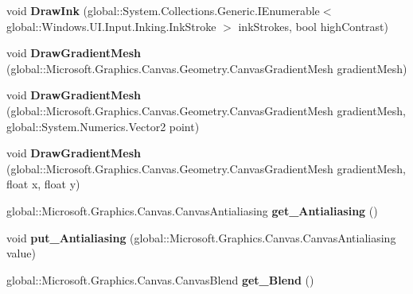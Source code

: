 \begin{DoxyCompactItemize}
void {\bfseries Draw\+Ink} (global\+::\+System.\+Collections.\+Generic.\+I\+Enumerable$<$ global\+::\+Windows.\+U\+I.\+Input.\+Inking.\+Ink\+Stroke $>$ ink\+Strokes, bool high\+Contrast)
\item 
\mbox{\label{class_microsoft_1_1_graphics_1_1_canvas_1_1_canvas_drawing_session_acf46c3a66def149f54e2c2cbc75af600}} 
void {\bfseries Draw\+Gradient\+Mesh} (global\+::\+Microsoft.\+Graphics.\+Canvas.\+Geometry.\+Canvas\+Gradient\+Mesh gradient\+Mesh)
\item 
\mbox{\label{class_microsoft_1_1_graphics_1_1_canvas_1_1_canvas_drawing_session_a6725dffba5937e6088ddbc6132d69550}} 
void {\bfseries Draw\+Gradient\+Mesh} (global\+::\+Microsoft.\+Graphics.\+Canvas.\+Geometry.\+Canvas\+Gradient\+Mesh gradient\+Mesh, global\+::\+System.\+Numerics.\+Vector2 point)
\item 
\mbox{\label{class_microsoft_1_1_graphics_1_1_canvas_1_1_canvas_drawing_session_a304f85a9e137c9f1190e83693361bae7}} 
void {\bfseries Draw\+Gradient\+Mesh} (global\+::\+Microsoft.\+Graphics.\+Canvas.\+Geometry.\+Canvas\+Gradient\+Mesh gradient\+Mesh, float x, float y)
\item 
\mbox{\label{class_microsoft_1_1_graphics_1_1_canvas_1_1_canvas_drawing_session_ace70b6710e7b5968f6cb715842e62a5a}} 
global\+::\+Microsoft.\+Graphics.\+Canvas.\+Canvas\+Antialiasing {\bfseries get\+\_\+\+Antialiasing} ()
\item 
\mbox{\label{class_microsoft_1_1_graphics_1_1_canvas_1_1_canvas_drawing_session_a643deac9ab9103ed88e1228b0604aa37}} 
void {\bfseries put\+\_\+\+Antialiasing} (global\+::\+Microsoft.\+Graphics.\+Canvas.\+Canvas\+Antialiasing value)
\item 
\mbox{\label{class_microsoft_1_1_graphics_1_1_canvas_1_1_canvas_drawing_session_af6c74d142fed43142881bd3d9d4d837a}} 
global\+::\+Microsoft.\+Graphics.\+Canvas.\+Canvas\+Blend {\bfseries get\+\_\+\+Blend} ()

\end{DoxyCompactItemize}
